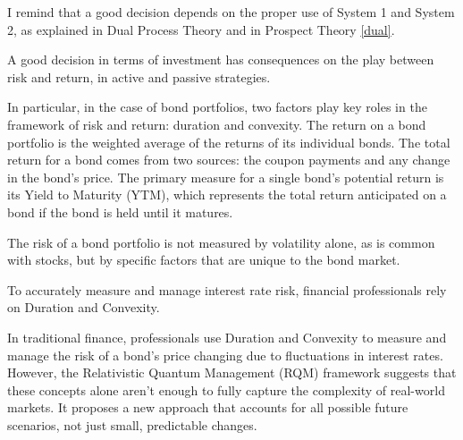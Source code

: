 \documentclass{article}
\begin{document}
I remind that a good decision depends on the proper use of System 1 and System 2, as explained in Dual Process Theory and in Prospect Theory \ref{dual}. 

A good decision in terms of investment has consequences on the play between risk and return, in active and passive strategies.


In particular, in the case of bond portfolios, two factors play key roles in the framework of risk and return: duration and convexity.
The return on a bond portfolio is the weighted average of the returns of its individual bonds. The total return for a bond comes from two sources: the coupon payments and any change in the bond's price. The primary measure for a single bond's potential return is its Yield to Maturity (YTM), which represents the total return anticipated on a bond if the bond is held until it matures.

The risk of a bond portfolio is not measured by volatility alone, as is common with stocks, but by specific factors that are unique to the bond market. 


To accurately measure and manage interest rate risk, financial professionals rely on Duration and Convexity.

In traditional finance, professionals use Duration and Convexity to measure and manage the risk of a bond's price changing due to fluctuations in interest rates. However, the Relativistic Quantum Management (RQM) framework suggests that these concepts alone aren't enough to fully capture the complexity of real-world markets. It proposes a new approach that accounts for all possible future scenarios, not just small, predictable changes.
\end{document}
